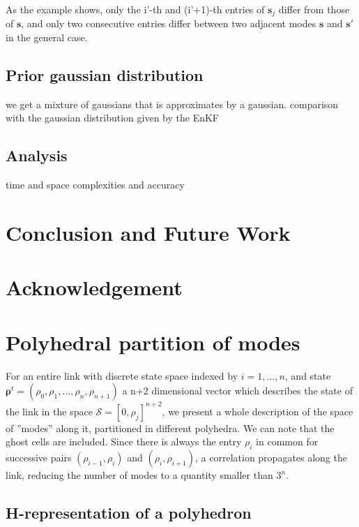 \documentclass[11pt]{article}
\numberwithin{equation}{section}
\numberwithin{figure}{section}
\numberwithin{table}{section}
\begin{document}
As the example shows, only the i'-th and (i'+1)-th entries of $\boldsymbol s_{j}$ differ from those of $\boldsymbol s$, and only two consecutive entries differ between two adjacent modes $\boldsymbol s$ and $\boldsymbol s'$ in the general case.


\subsection{Prior gaussian distribution}

we get a mixture of gaussians that is approximates by a gaussian. comparison with the gaussian distribution given by the EnKF

\subsection{Analysis}

time and space complexities and accuracy

\section{Conclusion and Future Work}

\section{Acknowledgement}

\appendix

\section{Polyhedral partition of modes}

For an entire link with discrete state space indexed by $i = 1,...,n$, and state $\boldsymbol\rho^{t} = (\rho_{0},\rho_{1},...,\rho_{n},\rho_{n+1})$ a n+2 dimensional vector which describes the state of the link in the space $\mathcal{S} = [0,\rho_{j}]^{n+2}$, we present a whole description of the space of ''modes'' along it, partitioned in different polyhedra. We can note that the ghost cells are included. Since there is always the entry $\rho_{i}$ in common for successive pairs $(\rho_{i-1},\rho_{i})$ and $(\rho_{i},\rho_{i+1})$, a correlation propagates along the link, reducing the number of modes to a quantity smaller than $3^{n}$.


\subsection{H-representation of a polyhedron}\label{sec:polytope}
\end{document}
